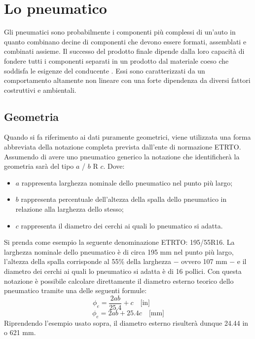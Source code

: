 \chapter{Lo pneumatico}
\label{Pneumatico}
%
Gli pneumatici sono probabilmente i componenti più complessi di un'auto in quanto combinano decine di componenti che devono essere formati, assemblati e combinati assieme. Il successo del prodotto finale dipende dalla loro capacità di fondere tutti i componenti separati in un prodotto dal materiale coeso che soddisfa le esigenze del conducente \cite{rill}. Essi sono caratterizzati da un comportamento altamente non lineare con una forte dipendenza da diversi fattori costruttivi e ambientali.
%
\section{Geometria}
Quando si fa riferimento ai dati puramente geometrici, viene utilizzata una forma abbreviata della notazione completa prevista dall'ente di normazione \ac{ETRTO}. Assumendo di avere uno pneumatico generico la notazione che identificherà la geometria sarà del tipo $a$ / $b$ R $c$. Dove:
\begin{itemize}
	\item $a$ rappresenta larghezza nominale dello pneumatico nel punto più largo;
	\item $b$ rappresenta percentuale dell'altezza della spalla dello pneumatico in relazione alla larghezza dello stesso;
	\item $c$ rappresenta il diametro dei cerchi ai quali lo pneumatico si adatta.
\end{itemize}
Si prenda come esempio la seguente denominazione \ac{ETRTO}: 195/55R16. La larghezza nominale dello pneumatico è di circa 195 mm nel punto più largo, l'altezza della spalla corrisponde al 55\% della larghezza $-$ ovvero 107 mm $-$ e il diametro dei cerchi ai quali lo pneumatico si adatta è di 16 pollici. Con questa notazione è possibile calcolare direttamente il diametro esterno teorico dello pneumatico tramite una delle seguenti formule:
%
\begin{equation}
\phi_e = \frac{2ab}{25.4}+c \quad \text{[in]} \qquad
\end{equation}
\begin{equation}
\phi_e = 2ab+25.4c \quad \text{[mm]}
\end{equation}
%
Riprendendo l'esempio usato sopra, il diametro esterno risulterà dunque 24.44 in o 621 mm.\\
